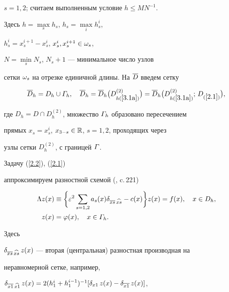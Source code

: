 $s=1,2$; считаем выполненным условие $h\le MN^{-1}$.


Здесь $h=\max\limits_s h_s$, $h_s=\max\limits_i h_s^i$,


$h^i_s=x_s^{i+1}-x_s^i$, $x_s^i, x_s^{i+1} \in \omega_s$,


$N=\min\limits_s N_s$, $N_s+1$ --- минимальное число узлов


сетки $\omega_s$ на отрезке единичной длины. На $\overline{D}$ введем сетку


\begin{equation} \label{3.1b}


\Dbh=D_h \cup \G_h, \quad \Dbh=\Dbh\big(D^{(2)}_{h(\ref{3.1a})}\big)=


\Dbh\big(D^{(2)}_{h(\ref{3.1a})};\, D_{(\ref{2.1})}\big),


\end{equation}


\eeqs


где $D_h=D\cap D^{(2)}_h$, множество $\varGamma_h$ образовано пересечением


прямых $x_s=x_s^i$, $x_{3-s}\in \Bbb R$, $s=1,2$, проходящих через


узлы сетки $D^{(2)}_h$, с границей $\varGamma$.





Задачу (\ref{2.2}), (\ref{2.1})


аппроксимируем разностной схемой (\cite{5}, c.\,221)


\begin{equation}\label{3.2}


\begin{split}


\La z(x) &\eq \bigg\{ \eps^2 \sum_{s=1,2} a_s(x) \dxx -c(x)\bigg\}


z(x) = f(x), \quad x\in D_h, \\


z(x)&= \vf(x), \quad x \in \G_h.


\end{split}


\end{equation}


Здесь


$\delta_{\overline{xs}\,\widehat{xs}}\,z(x)$ --- вторая (центральная) разностная производная на


неравномерной сетке, например, 


$\de_{\ovl{x1}\,\widehat{x1}}\,z(x)=2 (h_1^i+h_1^{i-1})^{-1}


[\delta_{x1}\,z(x)-\delta_{\ovl{x1}}\,z(x)]$,


